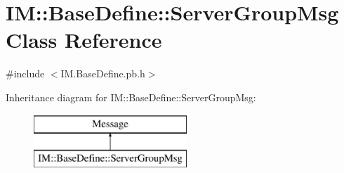 \hypertarget{class_i_m_1_1_base_define_1_1_server_group_msg}{}\section{I\+M\+:\+:Base\+Define\+:\+:Server\+Group\+Msg Class Reference}
\label{class_i_m_1_1_base_define_1_1_server_group_msg}


{\ttfamily \#include $<$I\+M.\+Base\+Define.\+pb.\+h$>$}

Inheritance diagram for I\+M\+:\+:Base\+Define\+:\+:Server\+Group\+Msg\+:\begin{figure}[H]
\begin{center}
\leavevmode
\includegraphics[height=2.000000cm]{class_i_m_1_1_base_define_1_1_server_group_msg}
\end{center}
\end{figure}
